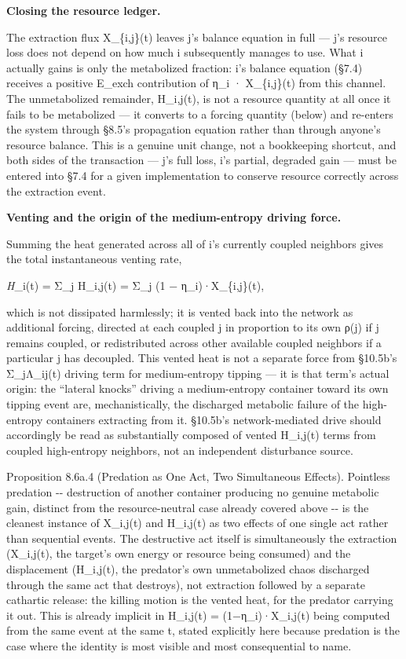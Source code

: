\documentclass[
]{article}
\begin{document}
\textbf{Closing the resource ledger.}

The extraction flux X\_\{i,j\}(t) leaves j's balance equation in full
--- j's resource loss does not depend on how much i subsequently manages
to use. What i actually gains is only the metabolized fraction: i's
balance equation (§7.4) receives a positive E\_exch contribution of η\_i
· X\_\{i,j\}(t) from this channel. The unmetabolized remainder,
H\_i,j(t), is not a resource quantity at all once it fails to be
metabolized --- it converts to a forcing quantity (below) and re-enters
the system through §8.5's propagation equation rather than through
anyone's resource balance. This is a genuine unit change, not a
bookkeeping shortcut, and both sides of the transaction --- j's full
loss, i's partial, degraded gain --- must be entered into §7.4 for a
given implementation to conserve resource correctly across the
extraction event.

\textbf{Venting and the origin of the medium-entropy driving force.}

Summing the heat generated across all of i's currently coupled neighbors
gives the total instantaneous venting rate,

\emph{H}\_i(t) = Σ\_j H\_i,j(t) = Σ\_j (1 − η\_i)·X\_\{i,j\}(t),

which is not dissipated harmlessly; it is vented back into the network
as additional forcing, directed at each coupled j in proportion to its
own ρ(j) if j remains coupled, or redistributed across other available
coupled neighbors if a particular j has decoupled. This vented heat is
not a separate force from §10.5b's Σ\_jΛ\_ij(t) driving term for
medium-entropy tipping --- it is that term's actual origin: the
``lateral knocks'' driving a medium-entropy container toward its own
tipping event are, mechanistically, the discharged metabolic failure of
the high-entropy containers extracting from it. §10.5b's
network-mediated drive should accordingly be read as substantially
composed of vented H\_i,j(t) terms from coupled high-entropy neighbors,
not an independent disturbance source.

Proposition 8.6a.4 (Predation as One Act, Two Simultaneous Effects).
Pointless predation -\/- destruction of another container producing no
genuine metabolic gain, distinct from the resource-neutral case already
covered above -\/- is the cleanest instance of X\_i,j(t) and H\_i,j(t)
as two effects of one single act rather than sequential events. The
destructive act itself is simultaneously the extraction (X\_i,j(t), the
target's own energy or resource being consumed) and the displacement
(H\_i,j(t), the predator's own unmetabolized chaos discharged through
the same act that destroys), not extraction followed by a separate
cathartic release: the killing motion is the vented heat, for the
predator carrying it out. This is already implicit in H\_i,j(t) =
(1−η\_i)·X\_i,j(t) being computed from the same event at the same t,
stated explicitly here because predation is the case where the identity
is most visible and most consequential to name.
\end{document}
